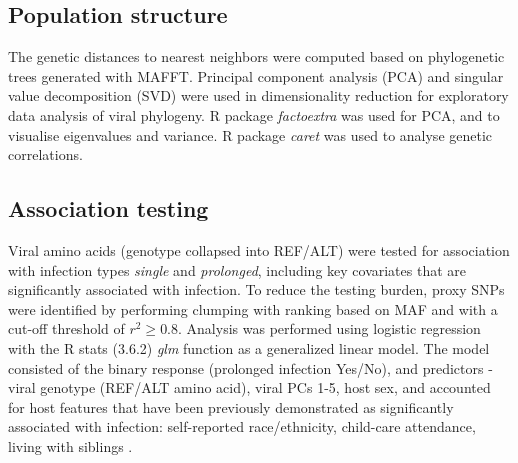 \documentclass{article} %
\begin{document}
\subsection{Population structure}
The genetic distances to nearest neighbors were computed based on phylogenetic 
trees generated with MAFFT.
Principal component analysis (PCA) and singular value decomposition (SVD) were used in dimensionality reduction for exploratory data analysis of viral phylogeny.
R package \textit{factoextra} was used for PCA, and to visualise eigenvalues and variance. 
R package \textit{caret} was used to analyse genetic correlations.

\subsection{Association testing}
Viral amino acids (genotype collapsed into REF/ALT) were tested for association with infection types \textit{single} and \textit{prolonged}, 
including key covariates that are significantly associated with infection.
To reduce the testing burden, proxy SNPs were identified by
performing clumping with ranking based on MAF and with a cut-off threshold of $r^2 \ge 0.8$.
Analysis was performed using logistic regression with the
R stats (3.6.2) \textit{glm} function as a generalized linear model.
The model consisted of the binary response (prolonged infection Yes/No), and predictors - viral genotype (REF/ALT amino acid), viral PCs 1-5, host sex, and accounted for host features that have been previously demonstrated as significantly associated with infection: 
self-reported race/ethnicity, child-care attendance, living with siblings 
\citep{rosas2022upper}.

\end{document}
